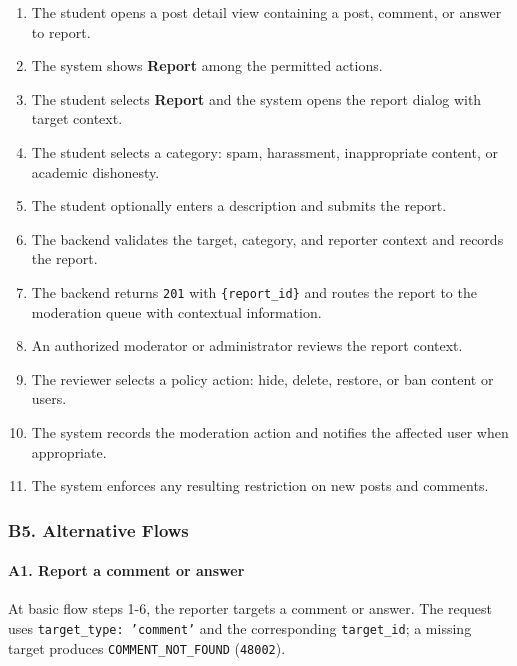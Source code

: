 \documentclass[12pt]{article}
\begin{document}
\begin{enumerate}
\item The student opens a post detail view containing a post, comment, or answer to report.
\item The system shows \textbf{Report} among the permitted actions.
\item The student selects \textbf{Report} and the system opens the report dialog with target context.
\item The student selects a category: spam, harassment, inappropriate content, or academic dishonesty.
\item The student optionally enters a description and submits the report.
\item The backend validates the target, category, and reporter context and records the report.
\item The backend returns \texttt{201} with \texttt{\{report\_id\}} and routes the report to the moderation queue with contextual information.
\item An authorized moderator or administrator reviews the report context.
\item The reviewer selects a policy action: hide, delete, restore, or ban content or users.
\item The system records the moderation action and notifies the affected user when appropriate.
\item The system enforces any resulting restriction on new posts and comments.
\end{enumerate}
\par\medskip

\hypertarget{sec:b5-alternative-flows}{}
\subsubsection*{B5. Alternative Flows}
\par\medskip

\hypertarget{sec:a1-report-a-comment-or-answer}{}
\paragraph*{A1. Report a comment or answer}
\par\medskip

At basic flow steps 1-6, the reporter targets a comment or answer. The request uses \texttt{target\_type: 'comment'} and the corresponding \texttt{target\_id}; a missing target produces \texttt{COMMENT\_NOT\_FOUND} (\texttt{48002}).
\par\medskip
\end{document}
